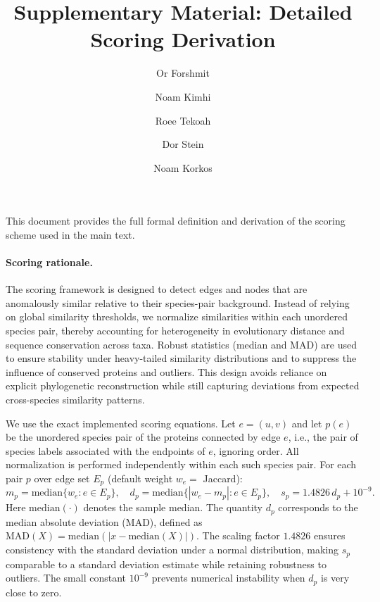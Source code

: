\documentclass{article}
\title{Supplementary Material: Detailed Scoring Derivation}
\author{Or Forshmit \and Noam Kimhi \and Roee Tekoah \and Dor Stein \and Noam Korkos}
\date{}
\begin{document}
\maketitle
\noindent This document provides the full formal definition and derivation of the scoring scheme used in the main text.

\paragraph{Scoring rationale.}
The scoring framework is designed to detect edges and nodes that are anomalously similar relative to their species-pair background. 
Instead of relying on global similarity thresholds, we normalize similarities within each unordered species pair, thereby accounting for heterogeneity in evolutionary distance and sequence conservation across taxa. 
Robust statistics (median and MAD) are used to ensure stability under heavy-tailed similarity distributions and to suppress the influence of conserved proteins and outliers. This design avoids reliance on explicit phylogenetic reconstruction while still capturing deviations from expected cross-species similarity patterns.

\vspace{0.5em}
We use the exact implemented scoring equations. Let $e=(u,v)$ and let $p(e)$ be the unordered species pair of the proteins connected by edge $e$, i.e., the pair of species labels associated with the endpoints of $e$, ignoring order. All normalization is performed independently within each such species pair.
For each pair $p$ over edge set $E_p$ (default weight $w_e=$ Jaccard):
\begin{equation}
m_p=\mathrm{median}\{w_e:e\in E_p\},\quad
d_p=\mathrm{median}\{|w_e-m_p|:e\in E_p\},\quad
s_p=1.4826\,d_p+10^{-9}.
\end{equation}
Here $\mathrm{median}(\cdot)$ denotes the sample median. The quantity $d_p$ corresponds to the median absolute deviation (MAD), defined as $\mathrm{MAD}(X)=\mathrm{median}(|x - \mathrm{median}(X)|)$.
The scaling factor $1.4826$ ensures consistency with the standard deviation under a normal distribution, making $s_p$ comparable to a standard deviation estimate while retaining robustness to outliers. 
The small constant $10^{-9}$ prevents numerical instability when $d_p$ is very close to zero.
\end{document}
